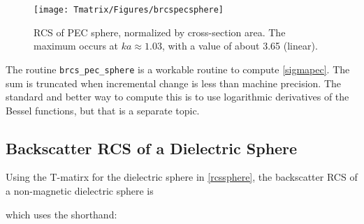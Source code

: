 %
%
%
%


\begin{figure}[H] 
   \centering
   \texttt{[image: Tmatrix/Figures/brcspecsphere]} 
   \caption{RCS of PEC sphere, normalized by cross-section area.  The maximum occurs at $ka \approx 1.03$, with a value of about 3.65 (linear).}
\end{figure}


The routine \texttt{brcs\_pec\_sphere} is a workable routine to compute \eqref{sigmapec}. The sum is truncated when incremental change is less than machine precision. The standard and better way to compute this is to use logarithmic derivatives of the Bessel functions, but that is a separate topic.

{\footnotesize
{}
}

\subsection{Backscatter RCS of a Dielectric Sphere}

Using the T-matirx for the dielectric sphere in \eqref{rcssphere}, the backscatter RCS of a non-magnetic dielectric sphere is 

which uses the shorthand: 


